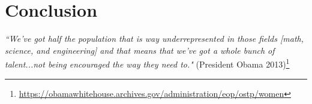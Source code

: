 \documentclass[12pt]{article}
\begin{document}
\section{Conclusion}








\textit{``We've got half the population that is way underrepresented in those fields [math, science, and engineering] and that means that we've got a whole bunch of talent...not being encouraged the way they need to."} (President Obama 2013)\footnote{\url{https://obamawhitehouse.archives.gov/administration/eop/ostp/women}}





\end{document}
